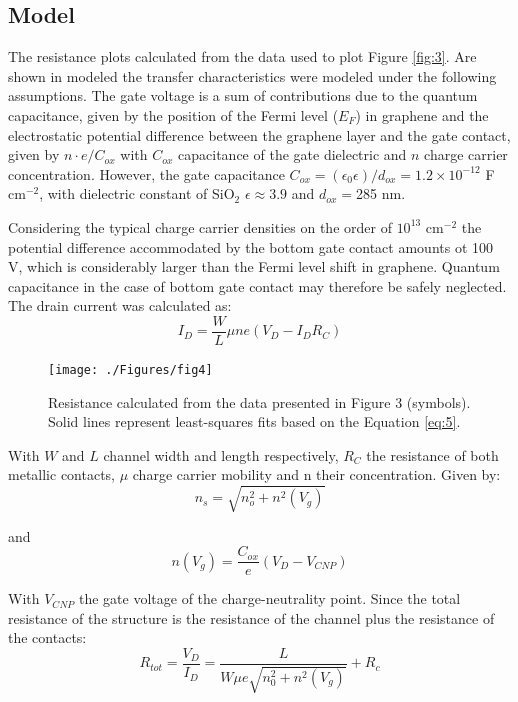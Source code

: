 \documentclass[preprint,aip,jap]{revtex4-2}
\begin{document}
\subsection{Model}
\label{sec:model}
The resistance plots calculated from the data used to plot Figure \ref{fig:3}.
  Are shown in modeled the transfer characteristics were modeled under the following assumptions.
 The gate voltage is a sum of contributions due to the quantum capacitance, given by the position of the Fermi level  ($E_F$) in graphene and the  electrostatic potential difference between the graphene layer and the gate contact, given by $n\cdot e/C_{ox}$ with $C_{ox}$ capacitance of the gate dielectric and $n$  charge carrier concentration\cite{sze-2006,chhikara-2014}.
  However, the gate capacitance $C_{ox}=(\epsilon_0\epsilon)/d_{ox} =1.2\times10^{-12}$ F cm$^{-2}$, with dielectric constant of SiO$_{2}$  $\epsilon \approx 3.9$ and $d_{ox}=$285 nm.

  Considering the typical charge carrier densities on the order of $10^{13}$ cm$^{-2}$ the potential difference accommodated by the bottom gate contact amounts ot 100 V, which is considerably larger than the Fermi level shift in graphene.
  Quantum capacitance in the case of bottom gate contact may therefore be safely neglected\cite{das-2008}.
 The drain current was  calculated as:
\begin{equation}
  \label{eq:2}
  I_{D}=\frac{W}{L}\mu n e(V_{D}- I_{D}R_{C})
\end{equation}

\begin{figure}[htb]
  \centering
   \texttt{[image: ./Figures/fig4]}  
  \caption{Resistance calculated from the data presented in Figure 3 (symbols).
 Solid lines represent least-squares fits based on the Equation \ref{eq:5}.
}
  \label{fig:4}
\end{figure}

\noindent With $W$ and $L$ channel width and length respectively, $R_{C}$ the resistance of both metallic contacts, $\mu$ charge carrier mobility and n their concentration.
 Given by:
\begin{equation}
  \label{eq:3}
  n_{s}=\sqrt{n_{o}^{2}+n^{2}(V_{g})}
\end{equation}

and 
\begin{equation}
  \label{eq:4}
  n(V_{g})= \frac{C_{ox}}{e}(V_{D}- V_{CNP})
\end{equation}


\noindent With $V_{CNP}$ the gate voltage of the charge-neutrality point\cite{xia-2010}.
 Since the total resistance of the structure is the resistance of the channel plus the resistance of the contacts:
\begin{equation}
  \label{eq:5}
  R_{tot} = \frac{V_{D}}{I_{D}} = \frac{L}{W\mu e\sqrt{n_{0}^{2}+n^{2}(V_{g})}} + R_{c}
\end{equation}
\end{document}
